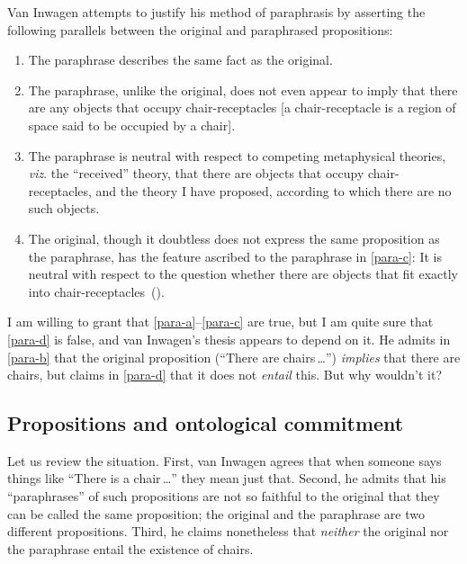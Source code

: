 \documentclass[11pt]{article}
\begin{document}
\begin{spacing}{1.5}
Van Inwagen attempts to justify his method of paraphrasis by asserting
the following parallels between the original and paraphrased
propositions:
\begin{enumerate}[ref=(\arabic*)]
	\item The paraphrase describes the same fact as the
          original.  \label{para-a}
	\item The paraphrase, unlike the original, does not even
          appear to imply that there are any objects that occupy
          chair-receptacles [a chair-receptacle is a region of space
            said to be occupied by a chair].  \label{para-b}
	\item The paraphrase is neutral with respect to competing
          metaphysical theories, {\em viz}.  the ``received'' theory,
          that there are objects that occupy chair-receptacles, and
          the theory I have proposed, according to which there are no
          such objects.  \label{para-c}
	\item The original, though it doubtless does not express the
          same proposition as the paraphrase, has the feature ascribed
          to the paraphrase in \ref{para-c}: It is neutral with
          respect to the question whether there are objects that fit
          exactly into
          chair-receptacles~(\citeyear[113]{inwagen1995}).  \label{para-d}
\end{enumerate}
I am willing to grant that \ref{para-a}--\ref{para-c} are true, but I
am quite sure that \ref{para-d} is false, and van Inwagen's thesis
appears to depend on it.  He admits in \ref{para-b} that the original
proposition (``There are chairs\,\ldots '') {\em implies} that there
are chairs, but claims in \ref{para-d} that it does not {\em entail}
this.  But why wouldn't it?

\subsection{Propositions and ontological commitment}
\label{prop-ont}
Let us review the situation.  First, van Inwagen agrees that when
someone says things like ``There is a chair\,\ldots '' they mean just
that.  Second, he admits that his ``paraphrases'' of such propositions
are not so faithful to the original that they can be called the same
proposition; the original and the paraphrase are two different
propositions.  Third, he claims nonetheless that {\em neither} the
original nor the paraphrase entail the existence of chairs.


\end{spacing}
\end{document}
